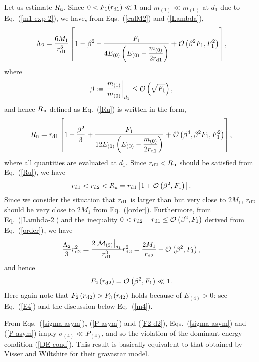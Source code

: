 \documentclass[aps,preprint,preprintnumber,nofootinbib,amsmath,amssymb,ascmac,bm,12pt]{revtex4}
\newcommand{\rdo}{r_{\rm d1}}
\newcommand{\rdt}{r_{\rm d2}}
\newcommand{\Ru}{R_{\rm u}}
\newcommand{\mz}{m_{(0)}}
\newcommand{\mo}{m_{(1)}}
\newcommand{\Eze}{E_{(0)}}
\newcommand{\Efo}{E_{(4)}}
\begin{document}
Let us estimate $\Ru$. 
Since $0<F_1(\rdo)\ll1$ and $\mo\ll\mz$ at $d_1$ due to Eq.~(\ref{m1-exp-2}), 
we have, from Eqs.~(\ref{calM2}) and (\ref{Lambda}), 
\begin{equation}
\Lambda_2=\frac{6M_1}{\rdo^3}\left[1-\beta^2-\frac{F_1}{4\Eze\left(\Eze-\dfrac{\mz}{2\rdo}\right)}
+{\cal O}\left(\beta^2 F_1,F_1^2\right)\right], \label{Lambda-2}
\end{equation}
where 
\begin{equation}
\beta:=\left.\frac{\mo}{\mz}\right|_{d_1} \leq{\cal O}\left(\sqrt{F_1}\right),   \label{beta}
\end{equation}
and hence $\Ru$ defined as Eq.~(\ref{Ru}) is written in the form,
\begin{equation}
\Ru=\rdo\left[1+\frac{\beta^2}{3}+\frac{F_1}{12\Eze\left(\Eze-\dfrac{\mz}{2\rdo}\right)}
+{\cal O}\left(\beta^4,\beta^2F_1,F_1^2\right)\right],
\label{Ru-2}
\end{equation}
where all quantities are evaluated at $d_1$. 
Since $\rdt<\Ru$ should be satisfied from Eq.~(\ref{Ru}), we have
\begin{equation}
\rdo<\rdt<\Ru=\rdo\left[1+{\cal O}\left(\beta^2,F_1\right)\right]. \label{order}
\end{equation} 
Since we consider the situation that $\rdo$ is larger than but very close 
to $2M_1$, $\rdt$ should be very close to $2M_1$ from 
Eq.~(\ref{order}). Furthermore, from Eq.~(\ref{Lambda-2}) 
and the inequality $0<\rdt-\rdo \leq {\cal O}\left(\beta^2,F_1\right)$ derived from Eq.~(\ref{order}), 
we have
$$
\frac{\Lambda_2}{3}\rdt^2=\frac{2\left.{\cal M}_{(2)}\right|_{d_1}}{\rdo^3}\rdt^2
=\frac{2M_1}{\rdt}+{\cal O}\left(\beta^2,F_1\right),
$$
and hence 
\begin{equation}
F_2\left(\rdt\right)={\cal O}\left(\beta^2,F_1\right)\ll1. \label{F2-d2}
\end{equation}
Here again note that $F_2\left(\rdt\right)>F_3\left(\rdt\right)$ holds because of $\Efo>0$: 
see Eq.~(\ref{E4}) and the discussion below Eq.~(\ref{m4}). 

From Eqs.~(\ref{sigma-asym}), (\ref{P-asym}) and (\ref{F2-d2}), 
Eqs.~(\ref{sigma-asym}) and (\ref{P-asym}) 
imply $\sigma_{(4)}\ll P_{(4)}$, and so  
the violation of the dominant energy condition (\ref{DE-cond}). 
This result is basically equivalent to that obtained by Visser and Wiltshire 
for their gravastar model\cite{VW2004}. 



\end{document}
